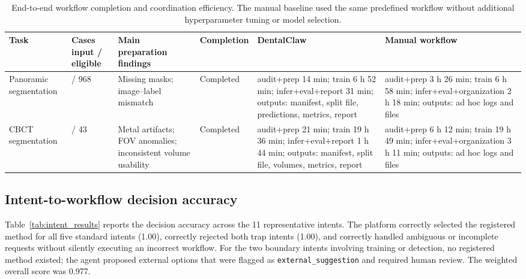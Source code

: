\documentclass[final,5p,times,twocolumn]{elsarticle}
\begin{document}
\begin{table}[!t]
\centering
\small
\setlength{\tabcolsep}{4pt}
\renewcommand{\arraystretch}{1.12}
\caption{End-to-end workflow completion and coordination efficiency. The manual baseline used the same predefined workflow without additional hyperparameter tuning or model selection.}
\label{tab:workflow_validation}
\begin{threeparttable}
\begin{tabularx}{\textwidth}{>{\raggedright\arraybackslash}p{2.3cm}>{\centering\arraybackslash}p{1.6cm}>{\raggedright\arraybackslash}p{3.0cm}>{\centering\arraybackslash}p{1.4cm}>{\raggedright\arraybackslash}X>{\raggedright\arraybackslash}X}
\toprule
Task & Cases input / eligible & Main preparation findings & Completion & DentalClaw & Manual workflow \\
\midrule
Panoramic segmentation & 1051 / 968 & Missing masks; image--label mismatch & Completed & audit+prep 14 min; train 6 h 52 min; infer+eval+report 31 min; outputs: manifest, split file, predictions, metrics, report & audit+prep 3 h 26 min; train 6 h 58 min; infer+eval+organization 2 h 18 min; outputs: ad hoc logs and files \\
\addlinespace
CBCT segmentation & 63 / 43 & Metal artifacts; FOV anomalies; inconsistent volume usability & Completed & audit+prep 21 min; train 19 h 36 min; infer+eval+report 1 h 44 min; outputs: manifest, split file, volumes, metrics, report & audit+prep 6 h 12 min; train 19 h 49 min; infer+eval+organization 3 h 11 min; outputs: ad hoc logs and files \\
\bottomrule
\end{tabularx}
\end{threeparttable}
\end{table}

\subsection{Intent-to-workflow decision accuracy}
Table~\ref{tab:intent_results} reports the decision accuracy across the 11 representative intents. The platform correctly selected the registered method for all five standard intents (1.00), correctly rejected both trap intents (1.00), and correctly handled ambiguous or incomplete requests without silently executing an incorrect workflow. For the two boundary intents involving training or detection, no registered method existed; the agent proposed external options that were flagged as \texttt{external\_suggestion} and required human review. The weighted overall score was 0.977.
\end{document}

